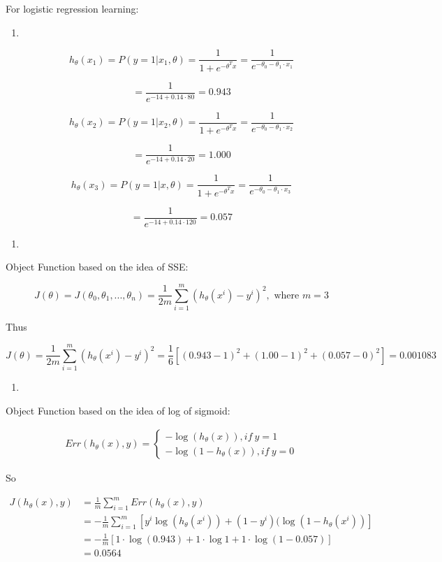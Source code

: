 \documentclass[11pt]{article}
\begin{document}
    For logistic regression learning:

\begin{enumerate}
\def\labelenumi{(\alph{enumi})}
\item
\end{enumerate}

\[h_\theta(x_1) = P(y=1|x_1, \theta) = \frac{1}{1+ e^{-\theta^T x}} = \frac{1}{e^{-\theta_0 - \theta_1 \cdot x_1}}\]

\[ = \frac{1}{e^{-14 + 0.14 \cdot 80}} = 0.943\]

\[h_\theta(x_2) = P(y=1|x_2, \theta) = \frac{1}{1+ e^{-\theta^T x}} = \frac{1}{e^{-\theta_0 - \theta_1 \cdot x_2}}\]

\[ = \frac{1}{e^{-14 + 0.14 \cdot 20}} = 1.000\]

\[h_\theta(x_3) = P(y=1|x, \theta) = \frac{1}{1+ e^{-\theta^T x}} = \frac{1}{e^{-\theta_0 - \theta_1 \cdot x_3}}\]

\[ = \frac{1}{e^{-14 + 0.14 \cdot 120}} = 0.057\]

    \begin{enumerate}
\def\labelenumi{(\alph{enumi})}
\setcounter{enumi}{1}
\item
\end{enumerate}

Object Function based on the idea of SSE:

\[J(\theta) = J(\theta_0, \theta_1, ..., \theta_n) = \frac{1}{2m} \sum^m_{i=1} (h_{\theta}(x^i) - y^i)^2, \text{ where } m = 3\]

Thus

\[J(\theta) = \frac{1}{2m} \sum^m_{i=1} (h_{\theta}(x^i) - y^i)^2 = \frac{1}{6} [ (0.943 - 1)^2 + (1.00 -1)^2 + (0.057 - 0)^2 ] = 0.001083\]

    \begin{enumerate}
\def\labelenumi{(\alph{enumi})}
\setcounter{enumi}{2}
\item
\end{enumerate}

Object Function based on the idea of log of sigmoid:

\begin{align}
Err(h_{\theta}(x), y) = 
\left\{\begin{matrix} - \log(h_{\theta}(x)), if \: y=1
\\ -\log(1-h_{\theta}(x)), if \: y=0
\end{matrix}\right.
\end{align}

So

\begin{equation}\label{eq:}
\begin{aligned}
J(h_{\theta}(x), y) &= \frac{1}{m} \sum^m_{i=1} Err(h_{\theta}(x), y) \\
&= - \frac{1}{m} \sum^m_{i=1}\left [ y ^i \log(h_{\theta}(x^i)) + (1-y^i) (\log(1-h_{\theta}(x^i)) \right ] \\
&= - \frac{1}{m} [1 \cdot \log(0.943) + 1 \cdot \log 1 + 1 \cdot \log(1-0.057)] \\
&= 0.0564
\end{aligned}
\end{equation}
\end{document}
